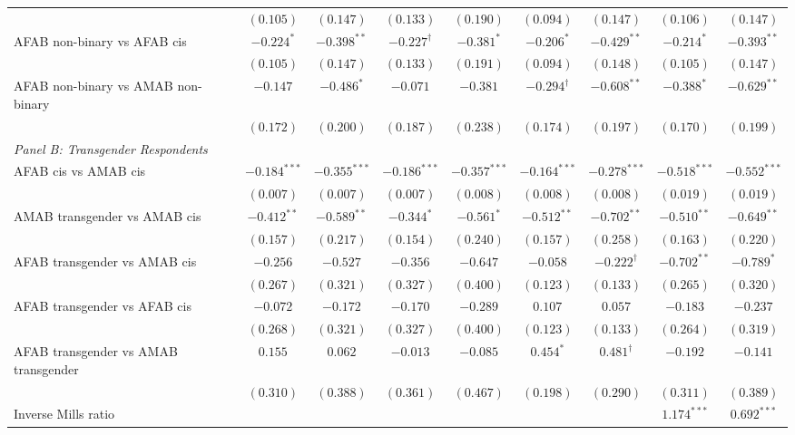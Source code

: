 \begin{table}[htpb]
{\begin{tabular}{l c c c c c c c c}
 & $(0.105)$ & $(0.147)$ & $(0.133)$ & $(0.190)$ & $(0.094)$ & $(0.147)$ & $(0.106)$ & $(0.147)$ \\
AFAB non-binary vs AFAB cis & $-0.224^{*}$ & $-0.398^{**}$ & $-0.227^{\dagger}$ & $-0.381^{*}$ & $-0.206^{*}$ & $-0.429^{**}$ & $-0.214^{*}$ & $-0.393^{**}$ \\
 & $(0.105)$ & $(0.147)$ & $(0.133)$ & $(0.191)$ & $(0.094)$ & $(0.148)$ & $(0.105)$ & $(0.147)$ \\
AFAB non-binary vs AMAB non-binary & $-0.147$ & $-0.486^{*}$ & $-0.071$ & $-0.381$ & $-0.294^{\dagger}$ & $-0.608^{**}$ & $-0.388^{*}$ & $-0.629^{**}$ \\
 & $(0.172)$ & $(0.200)$ & $(0.187)$ & $(0.238)$ & $(0.174)$ & $(0.197)$ & $(0.170)$ & $(0.199)$ \\
\hline
\multicolumn{9}{l}{\textit{Panel B: Transgender Respondents}} \\ 
AFAB cis vs AMAB cis & $-0.184^{***}$ & $-0.355^{***}$ & $-0.186^{***}$ & $-0.357^{***}$ & $-0.164^{***}$ & $-0.278^{***}$ & $-0.518^{***}$ & $-0.552^{***}$ \\
 & $(0.007)$ & $(0.007)$ & $(0.007)$ & $(0.008)$ & $(0.008)$ & $(0.008)$ & $(0.019)$ & $(0.019)$ \\
AMAB transgender vs AMAB cis & $-0.412^{**}$ & $-0.589^{**}$ & $-0.344^{*}$ & $-0.561^{*}$ & $-0.512^{**}$ & $-0.702^{**}$ & $-0.510^{**}$ & $-0.649^{**}$ \\
 & $(0.157)$ & $(0.217)$ & $(0.154)$ & $(0.240)$ & $(0.157)$ & $(0.258)$ & $(0.163)$ & $(0.220)$ \\
AFAB transgender vs AMAB cis & $-0.256$ & $-0.527$ & $-0.356$ & $-0.647$ & $-0.058$ & $-0.222^{\dagger}$ & $-0.702^{**}$ & $-0.789^{*}$ \\
 & $(0.267)$ & $(0.321)$ & $(0.327)$ & $(0.400)$ & $(0.123)$ & $(0.133)$ & $(0.265)$ & $(0.320)$ \\
AFAB transgender vs AFAB cis & $-0.072$ & $-0.172$ & $-0.170$ & $-0.289$ & $0.107$ & $0.057$ & $-0.183$ & $-0.237$ \\
 & $(0.268)$ & $(0.321)$ & $(0.327)$ & $(0.400)$ & $(0.123)$ & $(0.133)$ & $(0.264)$ & $(0.319)$ \\
AFAB transgender vs AMAB transgender & $0.155$ & $0.062$ & $-0.013$ & $-0.085$ & $0.454^{*}$ & $0.481^{\dagger}$ & $-0.192$ & $-0.141$ \\
 & $(0.310)$ & $(0.388)$ & $(0.361)$ & $(0.467)$ & $(0.198)$ & $(0.290)$ & $(0.311)$ & $(0.389)$ \\
\hline
Inverse Mills ratio &  &  &  &  &  &  & $1.174^{***}$ & $0.692^{***}$ \\

\end{tabular}}
\end{table}
